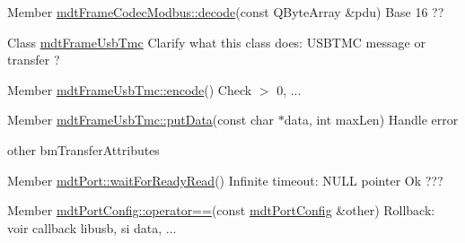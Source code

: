 \label{todo__todo000030}
\hypertarget{todo__todo000030}{}
 
\begin{DoxyDescription}
\item[Member \hyperlink{classmdt_frame_codec_modbus_a426f465363a49d70890a462b40677787}{mdtFrameCodecModbus::decode}(const QByteArray \&pdu) ]Base 16 ?? 
\end{DoxyDescription}

\label{todo__todo000034}
\hypertarget{todo__todo000034}{}
 
\begin{DoxyDescription}
\item[Class \hyperlink{classmdt_frame_usb_tmc}{mdtFrameUsbTmc} ]Clarify what this class does: USBTMC message or transfer ?
\end{DoxyDescription}

\label{todo__todo000033}
\hypertarget{todo__todo000033}{}
 
\begin{DoxyDescription}
\item[Member \hyperlink{classmdt_frame_usb_tmc_a9406dddfdd70f5dac729b2dbd728de77}{mdtFrameUsbTmc::encode}() ]Check $>$ 0, ... 
\end{DoxyDescription}

\label{todo__todo000031}
\hypertarget{todo__todo000031}{}
 
\begin{DoxyDescription}
\item[Member \hyperlink{classmdt_frame_usb_tmc_a06d2743a113bd2b4cf2ee44014ecd710}{mdtFrameUsbTmc::putData}(const char $\ast$data, int maxLen) ]Handle error 

other bmTransferAttributes 
\end{DoxyDescription}

\label{todo__todo000001}
\hypertarget{todo__todo000001}{}
 
\begin{DoxyDescription}
\item[Member \hyperlink{classmdt_port_a84594fdb56cd455a366c69b0a9228020}{mdtPort::waitForReadyRead}() ]Infinite timeout: NULL pointer Ok ??? 
\end{DoxyDescription}

\label{todo__todo000006}
\hypertarget{todo__todo000006}{}
 
\begin{DoxyDescription}
\item[Member \hyperlink{classmdt_port_config_a639c71f90cfeb7e2160ad90e9775054b}{mdtPortConfig::operator==}(const \hyperlink{classmdt_port_config}{mdtPortConfig} \&other) ]Rollback: voir callback libusb, si data, ... 
\end{DoxyDescription}

